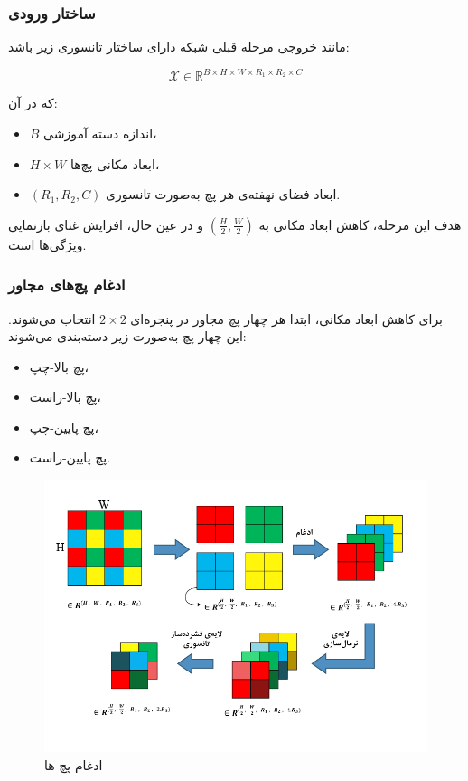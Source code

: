 \subsubsection*{ساختار ورودی}

مانند  خروجی مرحله قبلی شبکه دارای ساختار تانسوری زیر باشد:

\[
\mathcal{X} \in \mathbb{R}^{B \times H \times W \times R_1 \times R_2 \times C}
\]

که در آن:

\begin{itemize}
	\item $B$ اندازه دسته آموزشی،  
	\item $H \times W$ ابعاد مکانی پچ‌ها،  
	\item $(R_1, R_2, C)$ ابعاد فضای نهفته‌ی هر پچ به‌صورت تانسوری.
\end{itemize}

هدف این مرحله، کاهش ابعاد مکانی به $\left( \frac{H}{2}, \frac{W}{2} \right)$ و در عین حال، افزایش غنای بازنمایی ویژگی‌ها است.



\subsubsection*{ادغام پچ‌های مجاور}

برای کاهش ابعاد مکانی، ابتدا هر چهار پچ مجاور در پنجره‌ای $2 \times 2$ انتخاب می‌شوند. این چهار پچ به‌صورت زیر دسته‌بندی می‌شوند:

\begin{itemize}
	\item پچ بالا-چپ،
	\item پچ بالا-راست،
	\item پچ پایین-چپ،
	\item پچ پایین-راست.
\end{itemize}




\begin{figure}[h]
	\centering
	\begin{minipage}[b]{0.7\textwidth}
		\centering
		\includegraphics[width=\textwidth]{transformer_images/persian images/b24_2.png}
		\caption{ادغام پچ ها}
		\label{fig:pach merging}
	\end{minipage}
	\hfill
\end{figure}



